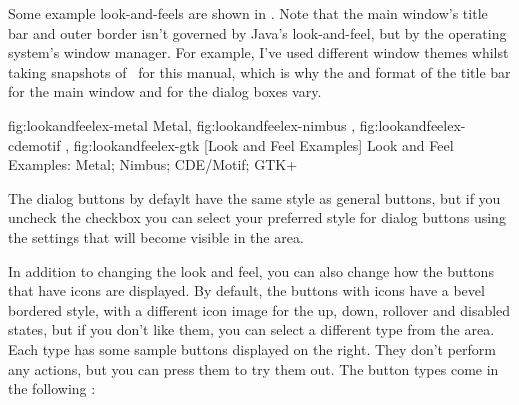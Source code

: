 Some example \glspl{look-and-feel} are shown in .
Note that the main window's title bar and outer border isn't
governed by Java's \gls{look-and-feel}, but by the operating
system's window manager. For example, I've used different window
themes whilst taking snapshots of \FlowframTk\ for this manual,
which is why the  and format of the title bar for the main
window and for the dialog boxes vary.

{
  {fig:lookandfeelex-metal}
    {}{Metal},
  {fig:lookandfeelex-nimbus}
    {}{},
  {fig:lookandfeelex-cdemotif}
    {}{},
  {fig:lookandfeelex-gtk}
    {}{}
}
[Look and Feel Examples]
{Look and Feel Examples:
 Metal;
 Nimbus;
 CDE\slash Motif;
 GTK+}


The dialog buttons by defaylt have the same style as general
buttons, but if you uncheck the  
checkbox you can select your preferred style for dialog buttons
using the settings that will become visible in the
 area.


In addition to changing the look and feel, you can also change how
the buttons that have icons are displayed. By default, the buttons
with icons have a bevel bordered style, with a different icon image for
the up, down, rollover and disabled states, but if you don't like
them, you can select a different type from the
 area. Each type has some sample
buttons displayed on the right. They don't perform any actions, but
you can press them to try them out. The button types come in the
following :

